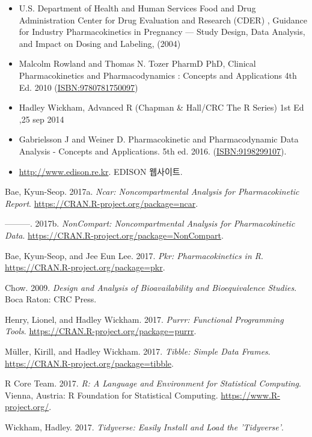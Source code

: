 \documentclass[12pt,]{krantz}
\providecommand{\tightlist}{%
  \setlength{\itemsep}{0pt}\setlength{\parskip}{0pt}}
\theoremstyle{definition}
\theoremstyle{definition}
\theoremstyle{definition}
\theoremstyle{remark}
\begin{document}
\begin{itemize}
\tightlist
\item
  U.S. Department of Health and Human Services Food and Drug
  Administration Center for Drug Evaluation and Research (CDER) ,
  Guidance for Industry Pharmacokinetics in Pregnancy --- Study Design,
  Data Analysis, and Impact on Dosing and Labeling, (2004)
\item
  Malcolm Rowland and Thomas N. Tozer PharmD PhD, Clinical
  Pharmacokinetics and Pharmacodynamics : Concepts and Applications 4th
  Ed. 2010 (\url{ISBN:9780781750097})
\item
  Hadley Wickham, Advanced R (Chapman \& Hall/CRC The R Series) 1st Ed
  ,25 sep 2014
\item
  Gabrielsson J and Weiner D. Pharmacokinetic and Pharmacodynamic Data
  Analysis - Concepts and Applications. 5th ed. 2016.
  (\url{ISBN:9198299107}).
\item
  \url{http://www.edison.re.kr}. EDISON 웹사이트.
\end{itemize}

\hypertarget{refs}{}
\hypertarget{ref-R-ncar}{}
Bae, Kyun-Seop. 2017a. \emph{Ncar: Noncompartmental Analysis for
Pharmacokinetic Report}. \url{https://CRAN.R-project.org/package=ncar}.

\hypertarget{ref-R-NonCompart}{}
---------. 2017b. \emph{NonCompart: Noncompartmental Analysis for
Pharmacokinetic Data}.
\url{https://CRAN.R-project.org/package=NonCompart}.

\hypertarget{ref-R-pkr}{}
Bae, Kyun-Seop, and Jee Eun Lee. 2017. \emph{Pkr: Pharmacokinetics in
R}. \url{https://CRAN.R-project.org/package=pkr}.

\hypertarget{ref-chow2009design}{}
Chow. 2009. \emph{Design and Analysis of Bioavailability and
Bioequivalence Studies}. Boca Raton: CRC Press.

\hypertarget{ref-R-purrr}{}
Henry, Lionel, and Hadley Wickham. 2017. \emph{Purrr: Functional
Programming Tools}. \url{https://CRAN.R-project.org/package=purrr}.

\hypertarget{ref-R-tibble}{}
Müller, Kirill, and Hadley Wickham. 2017. \emph{Tibble: Simple Data
Frames}. \url{https://CRAN.R-project.org/package=tibble}.

\hypertarget{ref-R-base}{}
R Core Team. 2017. \emph{R: A Language and Environment for Statistical
Computing}. Vienna, Austria: R Foundation for Statistical Computing.
\url{https://www.R-project.org/}.

\hypertarget{ref-R-tidyverse}{}
Wickham, Hadley. 2017. \emph{Tidyverse: Easily Install and Load the
'Tidyverse'}.
\end{document}
